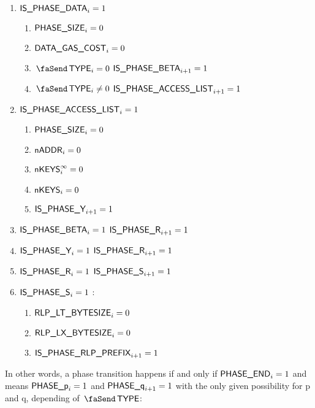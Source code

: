 \begin{enumerate}[resume]
\begin{enumerate}
            \item \If $\textsf{IS\_PHASE\_DATA}_{i} = 1$ \Then 
                \begin{enumerate}
                    \item \trash $\textsf{PHASE\_SIZE}_{i} = 0$
                    \item $\textsf{DATA\_GAS\_COST}_{i} = 0$
                    \item \If $\txType_{i} = 0$ \Then $\textsf{IS\_PHASE\_BETA}_{i + 1} = 1$
                    \item \If $\txType_{i} \ne 0$ \Then $\textsf{IS\_PHASE\_ACCESS\_LIST}_{i + 1} = 1$
                \end{enumerate}
            \item \If $\textsf{IS\_PHASE\_ACCESS\_LIST}_{i} = 1$ \Then 
                \begin{enumerate}
                    \item \trash $\textsf{PHASE\_SIZE}_{i} = 0$
                    \item $\textsf{nADDR}_{i} = 0$
                    \item $\textsf{nKEYS}^\infty_{i} = 0$
                    \item $\textsf{nKEYS}_{i} = 0$
                    \item $\textsf{IS\_PHASE\_Y}_{i + 1} = 1$
                \end{enumerate}
            \item \If $\textsf{IS\_PHASE\_BETA}_{i} = 1$ \Then $\textsf{IS\_PHASE\_R}_{i + 1} = 1$
            \item \If $\textsf{IS\_PHASE\_Y}_{i} = 1$ \Then $\textsf{IS\_PHASE\_R}_{i + 1} = 1$
            \item \If $\textsf{IS\_PHASE\_R}_{i} = 1$ \Then $\textsf{IS\_PHASE\_S}_{i + 1} = 1$
            \item \If $\textsf{IS\_PHASE\_S}_{i} = 1$ \Then:
                \begin{enumerate}
                    \item $\textsf{RLP\_LT\_BYTESIZE}_{i} = 0$
                    \item $\textsf{RLP\_LX\_BYTESIZE}_{i} = 0$
                    \item $\textsf{IS\_PHASE\_RLP\_PREFIX}_{i + 1} = 1$
                \end{enumerate}
        \end{enumerate}
\end{enumerate}

In other words, a phase transition happens if and only if $\textsf{PHASE\_END}_{i} = 1$ and means $\textsf{PHASE\_p}_{i} = 1$ and $\textsf{PHASE\_q}_{i + 1} = 1$ with the only given possibility for p and q, depending of $\txType$: 


